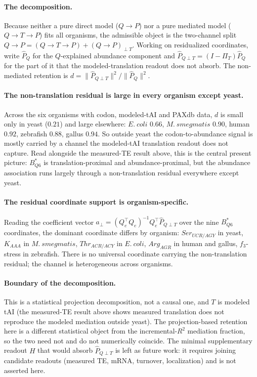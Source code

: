 \paragraph{The decomposition.}
Because neither a pure direct model ($Q\to P$) nor a pure mediated model ($Q\to T\to P$) fits all organisms, the admissible object is the two-channel split $Q\to P = (Q\to T\to P) + (Q\to P)_{\perp T}$.  Working on residualized coordinates, write $\widehat P_Q$ for the $Q$-explained abundance component and $\widehat P_{Q\perp T}=(I-\Pi_{T})\widehat P_Q$ for the part of it that the modeled-translation readout does not absorb.  The non-mediated retention is $d=\lVert\widehat P_{Q\perp T}\rVert^2/\lVert\widehat P_Q\rVert^2$.

\paragraph{The non-translation residual is large in every organism except yeast.}
Across the six organisms with codon, modeled-tAI and PAXdb data, $d$ is small only in yeast ($0.21$) and large elsewhere: $E.\ coli$ $0.66$, $M.\ smegmatis$ $0.90$, human $0.92$, zebrafish $0.88$, gallus $0.94$.  So outside yeast the codon-to-abundance signal is mostly carried by a channel the modeled-tAI translation readout does not capture.  Read alongside the measured-TE result above, this is the central present picture: $B^{\ast}_{Q6}$ is translation-proximal and abundance-proximal, but the abundance association runs largely through a non-translation residual everywhere except yeast.

\paragraph{The residual coordinate support is organism-specific.}
Reading the coefficient vector $a_{\perp}=(Q_e^{\top}Q_e)^{-1}Q_e^{\top}\widehat P_{Q\perp T}$ over the nine $B^{\ast}_{Q6}$ coordinates, the dominant coordinate differs by organism: $Ser_{UCR/AGY}$ in yeast, $K_{AAA}$ in $M.\ smegmatis$, $Thr_{ACR/ACY}$ in $E.\ coli$, $Arg_{AGR}$ in human and gallus, $f_3$-stress in zebrafish.  There is no universal coordinate carrying the non-translation residual; the channel is heterogeneous across organisms.

\paragraph{Boundary of the decomposition.}
This is a statistical projection decomposition, not a causal one, and $T$ is modeled tAI (the measured-TE result above shows measured translation does not reproduce the modeled mediation outside yeast).  The projection-based retention here is a different statistical object from the incremental-$R^2$ mediation fraction, so the two need not and do not numerically coincide.  The minimal supplementary readout $H$ that would absorb $\widehat P_{Q\perp T}$ is left as future work: it requires joining candidate readouts (measured TE, mRNA, turnover, localization) and is not asserted here.

